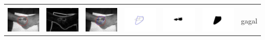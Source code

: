 \begin{table}[H]
\begin{tabular}{|m{0.7in}|m{0.7in}|m{0.7in}|m{0.7in}|m{0.7in}|m{0.7in}|m{0.7in}|}
		&  &  & & & &  \\
		\includegraphics[width=0.7in]{dataset/dataset_3/luka_merah/ready/10_interp_init.jpg}&
		\includegraphics[width=0.7in]{dataset/dataset_3/luka_merah/ready/10_interp_ext.jpg}&
		\includegraphics[width=0.7in]{dataset/dataset_3/luka_merah/ready/10_interp_result.jpg}&
		\includegraphics[width=0.7in]{dataset/dataset_3/luka_merah/ready/10_gt_r.jpg}&
		\includegraphics[width=0.7in]{dataset/dataset_3/luka_merah/ready/10_r.jpg}&
		\includegraphics[width=0.7in]{dataset/dataset_3/luka_merah/ready/10_interp_r.jpg}&
		gagal\\
		\hline
		
	\end{tabular}
\end{table}

